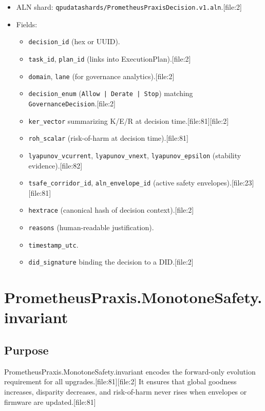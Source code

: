 \documentclass[11pt]{article}
\begin{document}
\begin{itemize}[nosep]
  \item ALN shard: \texttt{qpudatashards/PrometheusPraxisDecision.v1.aln}.[file:2]
  \item Fields:
    \begin{itemize}[nosep]
      \item \texttt{decision\_id} (hex or UUID).
      \item \texttt{task\_id}, \texttt{plan\_id} (links into ExecutionPlan).[file:2]
      \item \texttt{domain}, \texttt{lane} (for governance analytics).[file:2]
      \item \texttt{decision\_enum} (\texttt{Allow | Derate | Stop}) matching \texttt{GovernanceDecision}.[file:2]
      \item \texttt{ker\_vector} summarizing K/E/R at decision time.[file:81][file:2]
      \item \texttt{roh\_scalar} (risk-of-harm at decision time).[file:81]
      \item \texttt{lyapunov\_vcurrent}, \texttt{lyapunov\_vnext}, \texttt{lyapunov\_epsilon} (stability evidence).[file:82]
      \item \texttt{tsafe\_corridor\_id}, \texttt{aln\_envelope\_id} (active safety envelopes).[file:23][file:81]
      \item \texttt{hextrace} (canonical hash of decision context).[file:2]
      \item \texttt{reasons} (human-readable justification).
      \item \texttt{timestamp\_utc}.
      \item \texttt{did\_signature} binding the decision to a DID.[file:2]
    \end{itemize}
\end{itemize}

\section{PrometheusPraxis.MonotoneSafety.invariant}

\subsection{Purpose}

PrometheusPraxis.MonotoneSafety.invariant encodes the forward-only evolution requirement for all upgrades.[file:81][file:2]
It ensures that global goodness increases, disparity decreases, and risk-of-harm never rises when envelopes or firmware are updated.[file:81]
\end{document}

